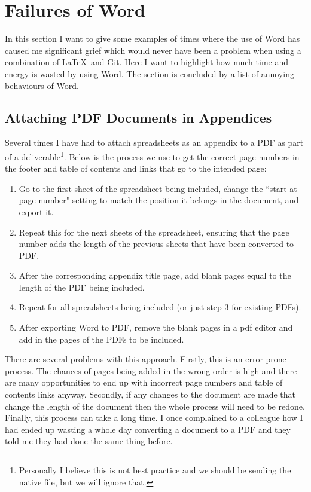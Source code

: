 \section{Failures of Word}
\label{sec:FailuresOfWord}

In this section I want to give some examples of times where the use of Word has caused me significant grief which would never have been a problem when using a combination of \LaTeX\ and Git. Here I want to highlight how much time and energy is wasted by using Word. The section is concluded by a list of annoying behaviours of Word.

\subsection{Attaching PDF Documents in Appendices}
\label{subsec:AttachingPdfDocumentsInAppendices}

Several times I have had to attach spreadsheets as an appendix to a PDF as part of a deliverable\footnote{Personally I believe this is not best practice and we should be sending the native file, but we will ignore that.}. Below is the process we use to get the correct page numbers in the footer and table of contents and links that go to the intended page:

\begin{enumerate}
	\item Go to the first sheet of the spreadsheet being included, change the ``start at page number" setting to match the position it belongs in the document, and export it.
	\item Repeat this for the next sheets of the spreadsheet, ensuring that the page number adds the length of the previous sheets that have been converted to PDF.
	\item After the corresponding appendix title page, add blank pages equal to the length of the PDF being included.
	\item Repeat for all spreadsheets being included (or just step 3 for existing PDFs).
	\item After exporting Word to PDF, remove the blank pages in a pdf editor and add in the pages of the PDFs to be included.
\end{enumerate}

There are several problems with this approach. Firstly, this is an error-prone process. The chances of pages being added in the wrong order is high and there are many opportunities to end up with incorrect page numbers and table of contents links anyway. Secondly, if any changes to the document are made that change the length of the document then the whole process will need to be redone. Finally, this process can take a long time. I once complained to a colleague how I had ended up wasting a whole day converting a document to a PDF and they told me they had done the same thing before.

